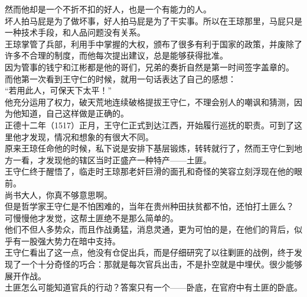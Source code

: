 \begin{multicols}{\theparacolNo}
然而他却是一个不折不扣的好人，也是一个有能力的人。\\

坏人拍马屁是为了做坏事，好人拍马屁是为了干实事。所以在王琼那里，马屁只是一种技术手段，和人品问题没有关系。\\

王琼掌管了兵部，利用手中掌握的大权，颁布了很多有利于国家的政策，并废除了许多不合理的制度，而他每次提出建议，总是能够获得批准。\\

因为管事的钱宁和江彬都是他的哥们，兄弟的奏折自然是第一时间签字盖章的。\\

而他第一次看到王守仁的时候，就用一句话表达了自己的感想：\\

“若用此人，可保天下太平！”\\

他充分运用了权力，破天荒地连续破格提拔王守仁，不理会别人的嘲讽和猜测，因为他知道，自己这样做是正确的。\\

正德十二年（1517）正月，王守仁正式到达江西，开始履行巡抚的职责。可到了这里他才发现，情况和想象的有很大不同。\\

原来王琼任命他的时候，私下说是安排下基层锻炼，转转就行了，然而王守仁到地方一看，才发现他的辖区当时正盛产一种特产——土匪。\\

王守仁终于醒悟了，临走时王琼那老奸巨滑的面孔和奇怪的笑容立刻浮现在他的眼前。\\

尚书大人，你真不够意思啊。\\

但是哲学家王守仁是不怕困难的，当年在贵州种田扶贫都不怕，还怕打土匪么？\\

可慢慢他才发觉，这帮土匪绝不是那么简单的。\\

他们不但人多势众，而且作战勇猛，消息灵通，更为可怕的是，在他们的背后，似乎有一股强大势力在暗中支持。\\

王守仁看出了这一点，他没有仓促出兵，而是仔细研究了以往剿匪的战例，终于发现了一个十分奇怪的巧合：那就是每次官兵出击，不是扑空就是中埋伏。很少能够展开作战。\\

土匪怎么可能知道官兵的行动？答案只有一个——卧底，在官府中有土匪的卧底。\\


\end{multicols}
